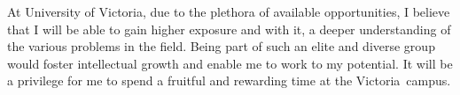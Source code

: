 \documentclass[a4paper,11pt]{article}
\newcommand{\uni}{University of Victoria}
\newcommand{\city}{Victoria}
\begin{document}
At \uni, due to the plethora of available opportunities, I believe that I will be able to gain higher exposure and with it, a deeper understanding of the various problems in the field. Being part of such an elite and diverse group would foster intellectual growth and enable me to work to my potential. It will be a privilege for me to spend a fruitful and rewarding time at the \city\ campus.

\printbibliography
\end{document}
